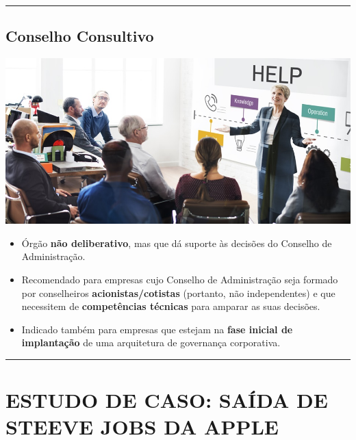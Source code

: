 \documentclass[
]{book}
\providecommand{\tightlist}{%
  \setlength{\itemsep}{0pt}\setlength{\parskip}{0pt}}
\begin{document}
\begin{center}\rule{0.5\linewidth}{0.5pt}\end{center}

\subsection{Conselho Consultivo}\label{conselho-consultivo}

\includegraphics[width=8.30208in,height=\textheight]{images/04-2025-08-26_27/03-conselho_consultivo.jpg}

\begin{itemize}
\tightlist
\item
  Órgão \textbf{não deliberativo}, mas que dá suporte às decisões do Conselho de Administração.
\item
  Recomendado para empresas cujo Conselho de Administração seja formado por conselheiros \textbf{acionistas/cotistas} (portanto, não independentes) e que necessitem de \textbf{competências técnicas} para amparar as suas decisões.
\item
  Indicado também para empresas que estejam na \textbf{fase inicial de implantação} de uma arquitetura de governança corporativa.
\end{itemize}

\begin{center}\rule{0.5\linewidth}{0.5pt}\end{center}

\section{ESTUDO DE CASO: SAÍDA DE STEEVE JOBS DA APPLE}\label{estudo-de-caso-sauxedda-de-steeve-jobs-da-apple}
\end{document}
